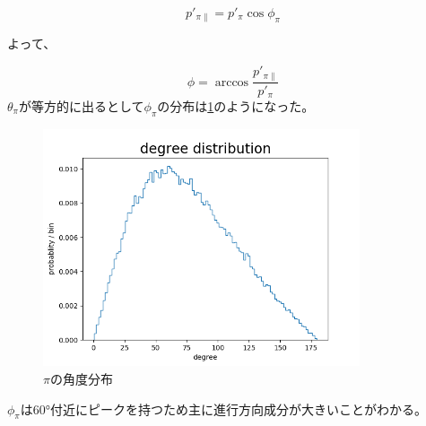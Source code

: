 \begin{equation}
    p'_{\pi \parallel} = p'_\pi \cos{\phi_\pi}
\end{equation}

よって、

\begin{equation}
    \phi = \arccos{\dfrac{p'_{\pi \parallel}}{p'_\pi}}
\end{equation}
$\theta_\pi$が等方的に出るとして$\phi_\pi$の分布は\ref{fig:angle8}のようになった。

\begin{figure}[H]
    \centering
    \includegraphics[height=7cm]{img/degree_distribution.png}
    \caption{$\pi$の角度分布}
    \label{fig:angle8}
\end{figure}

$\phi_\pi$は60°付近にピークを持つため主に進行方向成分が大きいことがわかる。